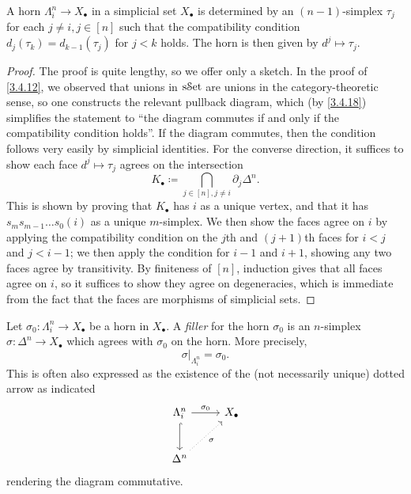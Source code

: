 \begin{proposition}\label{3.4.20}
	A horn $\Lambda_i^n \to X_{\bullet} $ in a simplicial set $X_{\bullet} $ is determined by an $(n-1)$-simplex $\tau_j$ for each $j\neq i,j\in[n]$ such that the compatibility condition $d_{j} (\tau_k)=d_{k-1} (\tau_j)$ for $j<k$ holds. The horn is then given by $d^j \mapsto \tau_j$.
\end{proposition}
\begin{proof}
	The proof is quite lengthy, so we offer only a sketch. In the proof of \cref{3.4.12}, we observed that unions in $\mathrm{s}\mathcal{S}\mathrm{et} $ are unions in the category-theoretic sense, so one constructs the relevant pullback diagram, which (by \cref{3.4.18}) simplifies the statement to ``the diagram commutes if and only if the compatibility condition holds''. If the diagram commutes, then the condition follows very easily by simplicial identities. For the converse direction, it suffices to show each face $d^j \mapsto \tau_j$ agrees on the intersection
	\[
		K_{\bullet} \coloneqq \bigcap_{j\in[n],j\neq i} \partial_j\Delta^n
	.\]
	This is shown by proving that $K_{\bullet} $ has $i$ as a unique vertex, and that it has $s_m s_{m-1} \ldots s_0(i)$ as a unique $m$-simplex. We then show the faces agree on $i$ by applying the compatibility condition on the $j$th and $(j+1)$th faces for $i<j$ and $j<i-1$; we then apply the condition for $i-1$ and $i+1$, showing any two faces agree by transitivity. By finiteness of $[n]$, induction gives that all faces agree on $i$, so it suffices to show they agree on degeneracies, which is immediate from the fact that the faces are morphisms of simplicial sets.
\end{proof}

\begin{definition}\label{3.4.21}
	Let $\sigma_0: \Lambda_i^n\to X_{\bullet} $ be a horn in $X_{\bullet} $. A \emph{filler} for the horn $\sigma_0$ is an $n$-simplex $\sigma : \Delta^n \to X_{\bullet} $ which agrees with $\sigma_0$ on the horn. More precisely,
	\[
		\sigma|_{\Lambda_i^n} =\sigma_0
	.\]
	This is often also expressed as the existence of the (not necessarily unique) dotted arrow as indicated
	\[\begin{tikzcd}[row sep = 2.5em, column sep = 2.5em]
	\Lambda_i^n \ar[" \sigma_0 ", r] \ar[hook, d]  & X_{\bullet}  \\
	\Delta^n \ar[" \sigma "', dotted, ur]  & 
	\end{tikzcd}\]
	rendering the diagram commutative.
\end{definition}


